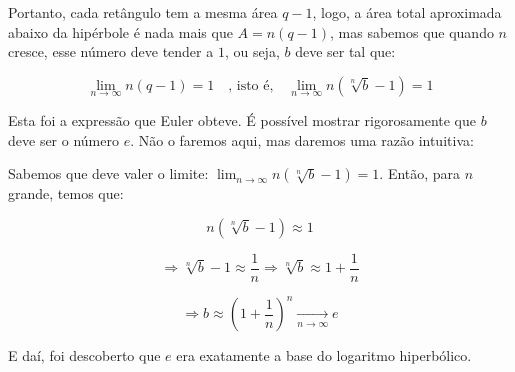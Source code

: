 Portanto, cada retângulo tem a mesma área $q - 1$, logo, a área total aproximada abaixo da hipérbole é nada mais que $A = n(q-1)$, mas sabemos que quando $n$ cresce, esse número deve tender a $1$, ou seja, $b$ deve ser tal que:

\[
    \lim_{n \to \infty} n(q - 1) = 1 \quad \text{, isto é,} \quad \lim_{n \to \infty} n(\sqrt[n]{b} - 1) = 1
\]

Esta foi a expressão que Euler obteve. É possível mostrar rigorosamente que $b$ deve ser o número $e$. Não o faremos aqui, mas daremos uma razão intuitiva:

Sabemos que deve valer o limite: $\lim_{n \to \infty} n(\sqrt[n]{b} - 1) = 1$. Então, para $n$ grande, temos que:

\[
n \left( \sqrt[n]{b} - 1 \right) \approx 1
\]

\[
\Rightarrow \sqrt[n]{b} - 1 \approx \frac{1}{n} 
\Rightarrow \sqrt[n]{b} \approx 1 + \frac{1}{n}
\]

\[
\Rightarrow b \approx \left( 1 + \frac{1}{n} \right)^n 
\xrightarrow[n \to \infty]{} e
\]

E daí, foi descoberto que $e$ era exatamente a base do logaritmo hiperbólico.